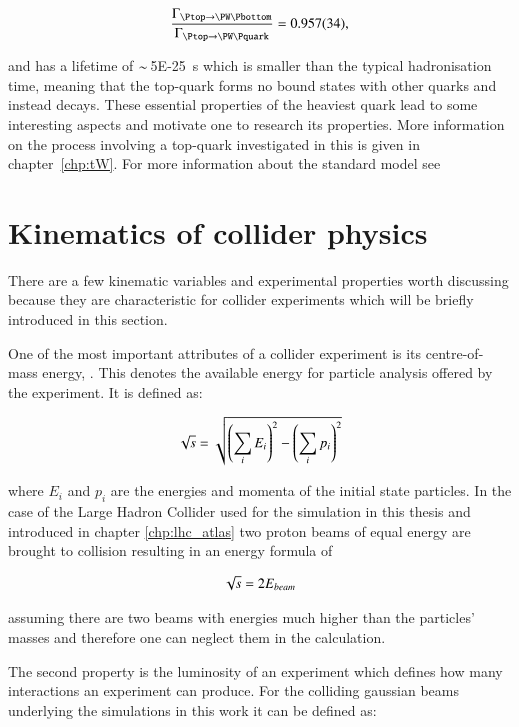 \begin{align}
\frac{\Gamma_{\Ptop \rightarrow \PW \Pbottom}}{\Gamma_{\Ptop \rightarrow \PW \Pquark}} = \SI{0.957(34)}{},
\end{align}

and has a lifetime of $\sim\!$ \SI{5E-25}{\second} which is smaller than the typical hadronisation time, meaning that the top-quark forms no bound states with other quarks and instead decays.
These essential properties of the heaviest quark lead to some interesting aspects and motivate one to research its properties.
More information on the process involving a top-quark investigated in this is given in chapter~\ref{chp:tW}.
For more information about the standard model see ~\cite{thomson, griffiths}




\section{Kinematics of collider physics}

There are a few kinematic variables and experimental properties worth discussing because they are characteristic for collider experiments which will be briefly introduced in this section.

One of the most important attributes of a collider experiment is its centre-of-mass energy, \Ecms. This denotes the available energy for particle analysis offered by the experiment.
It is defined as:

\begin{align}
\sqrt{s} = \sqrt{ \left( \sum_i E_i \right)^2 - \left( \sum_i p_i \right)^2 }
\end{align}


where $E_i$ and $p_i$ are the energies and momenta of the initial state particles.
In the case of the Large Hadron Collider used for the simulation in this thesis and introduced in chapter \ref{chp:lhc_atlas} two proton beams of equal energy are brought to collision resulting in an energy formula of

\begin{align}
\sqrt{s} = 2 E_{beam}
\end{align}

assuming there are two beams with energies much higher than the particles' masses and therefore one can neglect them in the calculation.

The second property is the luminosity of an experiment which defines how many interactions an experiment can produce. For the colliding gaussian beams underlying the simulations in this work it can be defined as:

